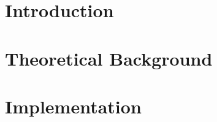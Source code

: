 \documentclass[twoside]{ctuthesis}
\begin{document}
\maketitle %




\part{Introduction}




\part{Theoretical Background}







\part{Implementation}





 
\appendix %

\printbibliography

\end{document}
